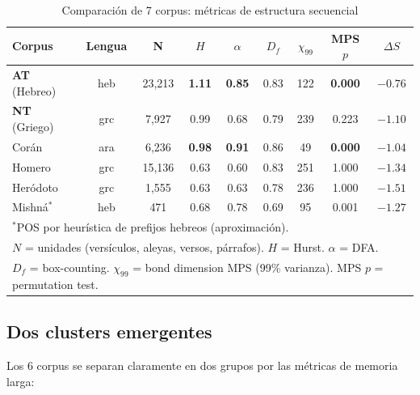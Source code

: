 \documentclass[12pt,a4paper]{article}
\newcommand{\ot}{\textcolor{otcolor}{\textbf{AT}}}
\newcommand{\nt}{\textcolor{ntcolor}{\textbf{NT}}}
\newcommand{\val}[1]{\textcolor{hlcolor}{\textbf{#1}}}
\begin{document}
\begin{table}[H]
\centering
\caption{Comparaci\'on de 7 corpus: m\'etricas de estructura secuencial}
\label{tab:comparison}
\small
\begin{tabular}{lcccccccc}
\toprule
\textbf{Corpus} & \textbf{Lengua} & \textbf{N} & \textbf{$H$} & \textbf{$\alpha$} & \textbf{$D_f$} & \textbf{$\chi_{99}$} & \textbf{MPS $p$} & \textbf{$\Delta S$} \\
\midrule
\ot{} (Hebreo) & heb & 23,213 & \val{1.11} & \val{0.85} & 0.83 & 122 & \val{0.000} & $-0.76$ \\
\nt{} (Griego) & grc & 7,927 & 0.99 & 0.68 & 0.79 & 239 & 0.223 & $-1.10$ \\
Cor\'an & ara & 6,236 & \val{0.98} & \val{0.91} & 0.86 & 49 & \val{0.000} & $-1.04$ \\
Homero & grc & 15,136 & 0.63 & 0.60 & 0.83 & 251 & 1.000 & $-1.34$ \\
Her\'odoto & grc & 1,555 & 0.63 & 0.63 & 0.78 & 236 & 1.000 & $-1.51$ \\
Mishn\'a${}^*$ & heb & 471 & 0.68 & 0.78 & 0.69 & 95 & 0.001 & $-1.27$ \\
\bottomrule
\multicolumn{9}{l}{\footnotesize ${}^*$POS por heur\'istica de prefijos hebreos (aproximaci\'on).} \\
\multicolumn{9}{l}{\footnotesize $N$ = unidades (vers\'iculos, aleyas, versos, p\'arrafos). $H$ = Hurst. $\alpha$ = DFA.} \\
\multicolumn{9}{l}{\footnotesize $D_f$ = box-counting. $\chi_{99}$ = bond dimension MPS (99\% varianza). MPS $p$ = permutation test.}
\end{tabular}
\end{table}

\subsection{Dos clusters emergentes}

Los 6 corpus se separan claramente en dos grupos por las m\'etricas de memoria larga:

\begin{center}
\end{center}
\end{document}
